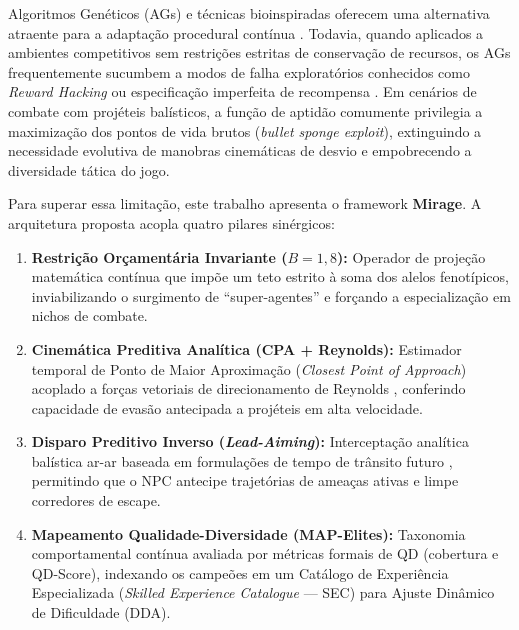 \documentclass[10pt,conference,twocolumn]{article}
\begin{document}
Algoritmos Genéticos (AGs) e técnicas bioinspiradas oferecem uma alternativa atraente para a adaptação procedural contínua \cite{goldberg1989genetic, spronck2006adaptive}. Todavia, quando aplicados a ambientes competitivos sem restrições estritas de conservação de recursos, os AGs frequentemente sucumbem a modos de falha exploratórios conhecidos como \textit{Reward Hacking} ou especificação imperfeita de recompensa \cite{amodei2016concrete}. Em cenários de combate com projéteis balísticos, a função de aptidão comumente privilegia a maximização dos pontos de vida brutos (\textit{bullet sponge exploit}), extinguindo a necessidade evolutiva de manobras cinemáticas de desvio e empobrecendo a diversidade tática do jogo.

Para superar essa limitação, este trabalho apresenta o framework \textbf{Mirage}. A arquitetura proposta acopla quatro pilares sinérgicos:
\begin{enumerate}
    \item \textbf{Restrição Orçamentária Invariante ($B = 1{,}8$):} Operador de projeção matemática contínua que impõe um teto estrito à soma dos alelos fenotípicos, inviabilizando o surgimento de ``super-agentes'' e forçando a especialização em nichos de combate.
    \item \textbf{Cinemática Preditiva Analítica (CPA + Reynolds):} Estimador temporal de Ponto de Maior Aproximação (\textit{Closest Point of Approach}) \cite{lee2014collision} acoplado a forças vetoriais de direcionamento de Reynolds \cite{reynolds1999steering}, conferindo capacidade de evasão antecipada a projéteis em alta velocidade.
    \item \textbf{Disparo Preditivo Inverso (\textit{Lead-Aiming}):} Interceptação analítica balística ar-ar baseada em formulações de tempo de trânsito futuro \cite{wang2014self}, permitindo que o NPC antecipe trajetórias de ameaças ativas e limpe corredores de escape.
    \item \textbf{Mapeamento Qualidade-Diversidade (MAP-Elites):} Taxonomia comportamental contínua \cite{mouret2015illuminating, cully2015robots, kirk2020exploring} avaliada por métricas formais de QD (cobertura e QD-Score), indexando os campeões em um Catálogo de Experiência Especializada (\textit{Skilled Experience Catalogue} --- SEC) \cite{glavin2015skilled} para Ajuste Dinâmico de Dificuldade (DDA).
\end{enumerate}
\end{document}

